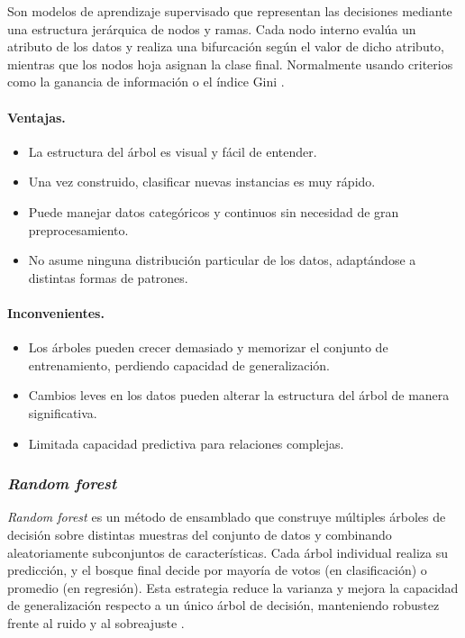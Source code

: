 Son modelos de aprendizaje supervisado que representan las decisiones mediante una estructura jerárquica de nodos y ramas. Cada nodo interno evalúa un atributo de los datos y realiza una bifurcación según el valor de dicho atributo, mientras que los nodos hoja asignan la clase final. Normalmente usando criterios como la ganancia de información o el índice Gini \cite{dt_ibm,dt_sklearn}.

\newpage
\paragraph*{\textbf{Ventajas.}}
\begin{itemize}
	\item La estructura del árbol es visual y fácil de entender.
	\item Una vez construido, clasificar nuevas instancias es muy rápido.
	\item Puede manejar datos categóricos y continuos sin necesidad de gran preprocesamiento.
	\item No asume ninguna distribución particular de los datos, adaptándose a distintas formas de patrones.
\end{itemize}

\paragraph*{\textbf{Inconvenientes.}}
\begin{itemize}
	\item Los árboles pueden crecer demasiado y memorizar el conjunto de entrenamiento, perdiendo capacidad de generalización.
	\item Cambios leves en los datos pueden alterar la estructura del árbol de manera significativa.
	\item Limitada capacidad predictiva para relaciones complejas.
\end{itemize}

\subsubsection{\textit{Random forest}}
\label{subsubsec:randomforest}

\textit{Random forest} es un método de ensamblado que construye múltiples árboles de decisión sobre distintas muestras del conjunto de datos y combinando aleatoriamente subconjuntos de características. Cada árbol individual realiza su predicción, y el bosque final decide por mayoría de votos (en clasificación) o promedio (en regresión). Esta estrategia reduce la varianza y mejora la capacidad de generalización respecto a un único árbol de decisión, manteniendo robustez frente al ruido y al sobreajuste \cite{rf_sklearn,rf_wiki1,rf_wiki2}.

